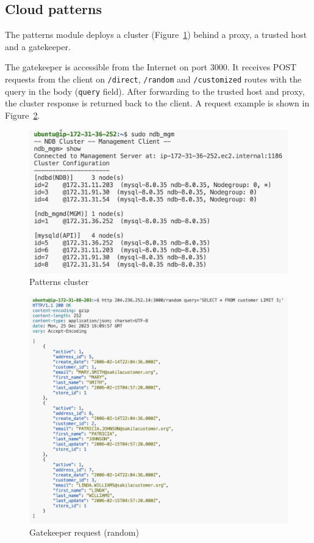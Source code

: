 \documentclass[letterpaper,headings=standardclasses,parskip=half]{scrartcl}
\begin{document}
\clearpage
\subsection{Cloud patterns}

The patterns module deploys a cluster (Figure~\ref{fig:patterns_cluster}) behind a proxy, a trusted host and a gatekeeper.

The gatekeeper is accessible from the Internet on port 3000. It receives POST requests from the client on \texttt{/direct}, \texttt{/random} and \texttt{/customized} routes with the query in the body (\texttt{query} field). After forwarding to the trusted host and proxy, the cluster response is returned back to the client. A request example is shown in Figure~\ref{fig:patterns_http}.


\begin{figure}[h]
    \centering
    \includegraphics[width=0.5\linewidth]{figures/Screenshot 2023-12-25 at 17.12.46.png}
    \caption{Patterns cluster}
    \label{fig:patterns_cluster}
\end{figure}

\begin{figure}[h]
    \centering
    \includegraphics[width=0.75\linewidth]{figures/Screenshot 2023-12-25 at 17.10.13.png}
    \caption{Gatekeeper request (random)}
    \label{fig:patterns_http}
\end{figure}
\end{document}
